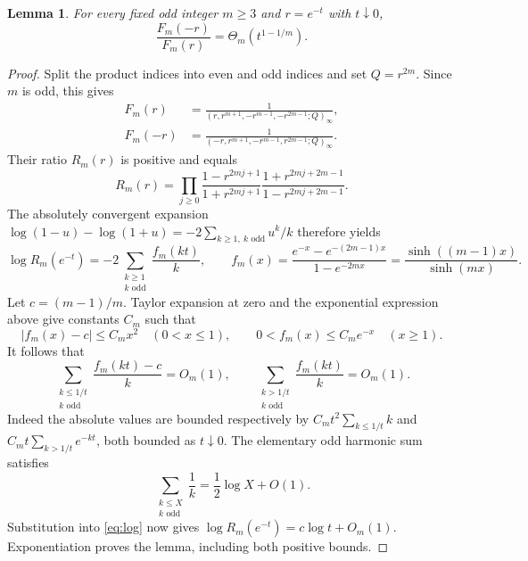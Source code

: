 \documentclass[11pt]{article}
\newtheorem{lemma}{Lemma}
\begin{document}
\begin{lemma}\label{lem:ratio}
For every fixed odd integer $m\ge3$ and $r=e^{-t}$ with $t\downarrow0$,
\[
                   \frac{F_m(-r)}{F_m(r)}
                         =\Theta_m(t^{1-1/m}).
\]
\end{lemma}
\begin{proof}
Split the product indices into even and odd indices and set $Q=r^{2m}$.
Since $m$ is odd, this gives
\begin{align*}
 F_m(r)&=\frac1{(r,r^{m+1},-r^{m-1},-r^{2m-1};Q)_\infty},\\
 F_m(-r)&=\frac1{(-r,r^{m+1},-r^{m-1},r^{2m-1};Q)_\infty}.
\end{align*}
Their ratio $R_m(r)$ is positive and equals
\begin{equation}\label{eq:product}
 R_m(r)=\prod_{j\ge0}
 \frac{1-r^{2mj+1}}{1+r^{2mj+1}}
 \frac{1+r^{2mj+2m-1}}{1-r^{2mj+2m-1}}.
\end{equation}
The absolutely convergent expansion
$\log(1-u)-\log(1+u)=-2\sum_{k\ge1,\ k\text{ odd}}u^k/k$
therefore yields
\begin{equation}\label{eq:log}
 \log R_m(e^{-t})
 =-2\sum_{\substack{k\ge1\\k\text{ odd}}}\frac{f_m(kt)}{k},
 \qquad
 f_m(x)=\frac{e^{-x}-e^{-(2m-1)x}}{1-e^{-2mx}}
       =\frac{\sinh((m-1)x)}{\sinh(mx)}.
\end{equation}
Let $c=(m-1)/m$. Taylor expansion at zero and the exponential
expression above give constants $C_m$ such that
\[
 |f_m(x)-c|\le C_m x^2\quad(0<x\le1),\qquad
 0<f_m(x)\le C_m e^{-x}\quad(x\ge1).
\]
It follows that
\[
 \sum_{\substack{k\le1/t\\k\text{ odd}}}
       \frac{f_m(kt)-c}{k}=O_m(1),
 \qquad
 \sum_{\substack{k>1/t\\k\text{ odd}}}
       \frac{f_m(kt)}{k}=O_m(1).
\]
Indeed the absolute values are bounded respectively by
$C_m t^2\sum_{k\le1/t}k$ and
$C_m t\sum_{k>1/t}e^{-kt}$, both bounded as $t\downarrow0$.
The elementary odd harmonic sum satisfies
\[
 \sum_{\substack{k\le X\\k\text{ odd}}}\frac1k
                 =\frac12\log X+O(1).
\]
Substitution into \eqref{eq:log} now gives
$\log R_m(e^{-t})=c\log t+O_m(1)$.
Exponentiation proves the lemma, including both positive bounds.
\end{proof}
\end{document}
